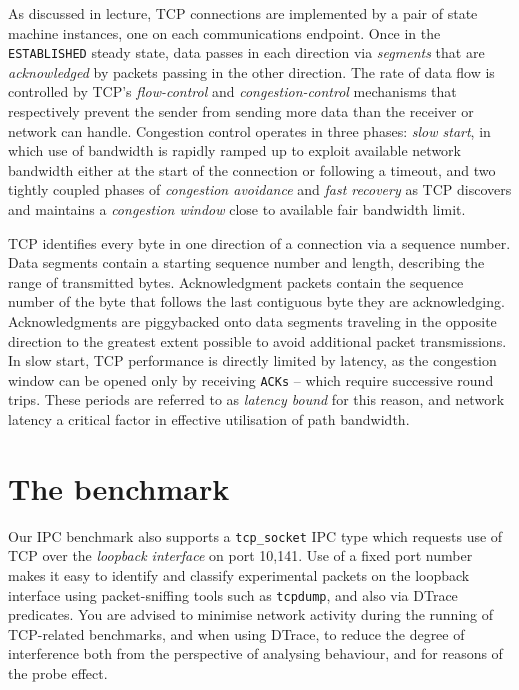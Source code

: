\documentclass[a4paper,10pt]{article}
\begin{document}
As discussed in lecture, TCP connections are implemented by a pair of state
machine instances, one on each communications endpoint.
Once in the \texttt{ESTABLISHED} steady state, data passes in each direction
via \textit{segments} that are \textit{acknowledged} by packets passing in the
other direction.
The rate of data flow is controlled by TCP's \textit{flow-control} and
\textit{congestion-control} mechanisms that respectively prevent the sender
from sending more data than the receiver or network can handle.
Congestion control operates in three phases: \textit{slow start}, in which use
of bandwidth is rapidly ramped up to exploit available network bandwidth
either at the start of the connection or following a timeout, and two tightly
coupled phases of \textit{congestion avoidance} and \textit{fast recovery} as
TCP discovers and maintains a \textit{congestion window} close to available
fair bandwidth limit.

TCP identifies every byte in one direction of a connection via a sequence
number.
Data segments contain a starting sequence number and length, describing the
range of transmitted bytes.
Acknowledgment packets contain the sequence number of the byte that follows
the last contiguous byte they are acknowledging.
Acknowledgments are piggybacked onto data segments traveling in the opposite
direction to the greatest extent possible to avoid additional packet
transmissions.
In slow start, TCP performance is directly limited by latency, as the
congestion window can be opened only by receiving \texttt{ACKs} -- which
require successive round trips.
These periods are referred to as \textit{latency bound} for this reason, and
network latency a critical factor in effective utilisation of path bandwidth.

\section*{The benchmark}

Our IPC benchmark also supports a \texttt{tcp\_socket} IPC
type which requests use of TCP over the \textit{loopback interface} on port
10,141.
Use of a fixed port number makes it easy to identify and classify experimental
packets on the loopback interface using packet-sniffing tools such as
\texttt{tcpdump}, and also via DTrace predicates.
You are advised to minimise network activity during the running of TCP-related
benchmarks, and when using DTrace, to reduce the degree of interference both
from the perspective of analysing behaviour, and for reasons of the probe
effect.
\end{document}

